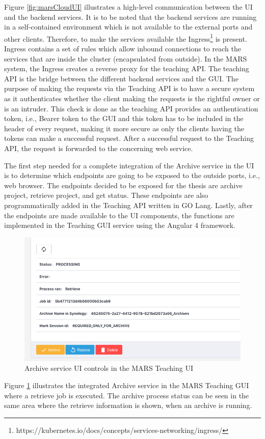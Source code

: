 Figure \ref{fig:marsCloudUI} illustrates a high-level communication between the UI and the backend services. It is to be noted that the backend services
are running in a self-contained environment which is not available to the external ports and other clients. Therefore, 
to make the services available the Ingress\footnote{https://kubernetes.io/docs/concepts/services-networking/ingress/} is present. Ingress contains
a set of rules which allow inbound connections to reach the services that are inside the cluster (encapsulated from outside). In the MARS system,
the Ingress creates a reverse proxy for the teaching API. The teaching API is the bridge between the different backend services and the GUI. The purpose
of making the requests via the Teaching API is to have a secure system as it authenticates whether the client making the requests is the rightful owner or 
is an intruder. This check is done as the teaching API provides an authentication token, i.e., Bearer token to the GUI and this token has to be included in the
header of every request, making it more secure as only the clients having the tokens can make a successful request. After a successful request to the Teaching API,
the request is forwarded to the concerning web service.


The first step needed for a complete integration of the Archive service in the UI is to determine which endpoints are going to be exposed to the outside ports, i.e., web browser.
The endpoints decided to be exposed for the thesis are archive project, retrieve project, and get status. These endpoints are also programmatically added
in the Teaching API written in GO Lang. Lastly, after the endpoints are made available to the UI components, the functions are implemented in the Teaching GUI service
using the Angular 4 framework. 

\begin{figure}[H]
    \centering \includegraphics[scale=0.5]{grafiken/archiveUI.png}
    \caption{Archive service UI controls in the MARS Teaching UI}
    \label{fig:archiveUI}
\end{figure}

Figure \ref{fig:archiveUI} illustrates the integrated Archive service in the MARS Teaching GUI where a retrieve job is executed. The archive process
status can be seen in the same area where the retrieve information is shown, when an archive is running.
